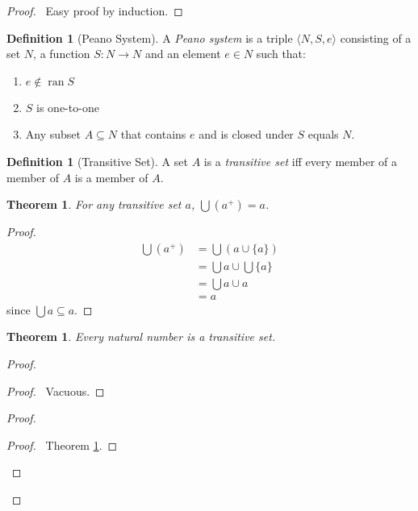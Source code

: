 \documentclass{article}
\let\qed\relax
\newtheorem{theorem}[axiom]{Theorem}
\theoremstyle{definition}
\newtheorem{definition}[axiom]{Definition}
\newcommand{\ran}{\ensuremath{\operatorname{ran}}}
\begin{document}
    \begin{proof}
        \pf\ Easy proof by induction. \qed
    \end{proof}

    \begin{definition}[Peano System]
        A \emph{Peano system} is a triple $\langle N, S, e \rangle$ consisting of a set $N$,
        a function $S : N \rightarrow N$ and an element $e \in N$ such that:
        \begin{enumerate}
            \item $e \notin \ran S$
            \item $S$ is one-to-one
            \item Any subset $A \subseteq N$ that contains $e$ and is closed under $S$ equals $N$.
        \end{enumerate}
    \end{definition}

    \begin{definition}[Transitive Set]
        A set $A$ is a \emph{transitive set} iff every member of a member of $A$ is a member of $A$.
    \end{definition}

    \begin{theorem}
        \label{theorem:union_transitive_successor}
        For any transitive set $a$, $\bigcup (a^+) = a$.
    \end{theorem}

    \begin{proof}
        \pf
        \begin{align*}
            \bigcup (a^+) & = \bigcup (a \cup \{ a \}) \\
            & = \bigcup a \cup \bigcup \{a\} \\
            & = \bigcup a \cup a \\
            & = a
        \end{align*}
        since $\bigcup a \subseteq a$. \qed
    \end{proof}

    \begin{theorem}
        \label{theorem:natural_number_transitive}
        Every natural number is a transitive set.
    \end{theorem}

    \begin{proof}
        \pf
        \begin{proof}
            \pf\ Vacuous.
        \end{proof}
        \begin{proof}
            \begin{proof}
                \pf\ Theorem \ref{theorem:union_transitive_successor}.
            \end{proof}
        \end{proof}
        \qed
    \end{proof}
\end{document}
